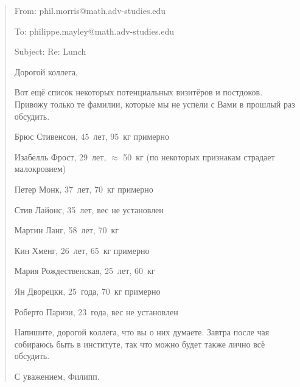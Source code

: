 \begin{quote}
From: phil.morris@math.adv-studies.edu

To: philippe.mayley@math.adv-studies.edu

Subject: Re: Lunch

\medskip
Дорогой коллега,

Вот ещё список некоторых потенциальных визитёров и постдоков.
Привожу только те фамилии, которые мы не успели с Вами в прошлый раз обсудить.

Брюс Стивенсон, 45~лет, 95~кг примерно

Изабелль Фрост, 29~лет, $\approx$ 50~кг (по некоторых признакам страдает
малокровием)

Петер Монк, 37~лет, 70~кг примерно

Стив Лайонс, 35~лет, вес не установлен

Мартин Ланг, 58~лет, 70~кг

Кин Хменг, 26~лет, 65~кг примерно

Мария Рождественская, 25~лет, 60~кг

Ян Дворецки, 25~года, 70~кг примерно

Роберто Паризи, 23~года, вес не установлен

Напишите, дорогой коллега, что вы о них думаете.
Завтра после чая собираюсь быть в институте, так что можно будет также лично всё
обсудить.

С уважением, Филипп.
\end{quote}
